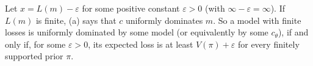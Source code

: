 \documentclass[11pt]{article}
\theoremstyle{definition}
\theoremstyle{remark}
\begin{document}


Let $x=L(m)-\varepsilon$ for some positive constant $\varepsilon>0$ (with $\infty-\varepsilon=\infty$). If $L(m)$ is finite, (a) says that $c$ uniformly dominates $m$. So a model with finite losses is uniformly dominated by some model (or equivalently by some $c_\theta$), if and only if, for some $\varepsilon>0$, its expected loss is at least $V(\pi)+\varepsilon$ for every finitely supported prior $\pi$.
\end{document}
